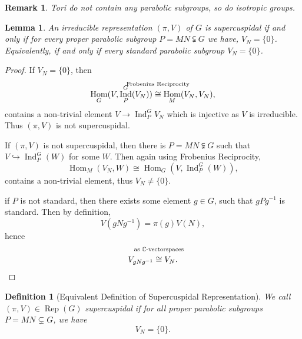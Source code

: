 \documentclass[8pt]{article}
\newtheorem{definition}{Definition}[section]
\newtheorem{lemma}{Lemma}[section]
\newtheorem{remark}{Remark}[section]
\DeclareMathOperator{\Ind}{Ind}
\DeclareMathOperator{\Rep}{Rep}
\DeclareMathOperator{\Hom}{Hom}
\newcommand{\C}[0]{\mathbb{C}}
\begin{document}
\begin{remark}
  Tori do not contain any parabolic subgroups, so do isotropic groups.
\end{remark}

\begin{lemma}
  \label{lemma_50}
  An irreducible representation $(\pi,V)$ of $G$ is supercuspidal if and only if for every proper parabolic subgroup $P=MN\subsetneqq G$ we have, $V_N=\{0\}$. Equivalently,
  if and only if every standard parabolic subgroup $V_N=\{0\}$.
\end{lemma}
\begin{proof}
  If $V_N=\{0\}$, then 
  \begin{equation*}
    \Hom_G(V,\Ind_P^G(V_N))\stackrel{\substack{\text{\makebox[0pt][c]{Frobenius Reciprocity}}\\\:}}{\cong} \Hom_M(V_N,V_N),
  \end{equation*}
  contains a non-trivial element $V\to\Ind_P^GV_N$ which is injective as $V$ is irreducible. Thus $(\pi,V)$ is not supercuspidal.
  \par If $(\pi,V)$ is not supercuspidal, then there is $P=MN\subsetneqq G$ such that $V\hookrightarrow \Ind_P^G(W)$ for some $W$. Then again using Frobenius Reciprocity,
  \begin{equation*}
    \Hom_M(V_N,W)\cong \Hom_G(V,\Ind_P^G(W)),
  \end{equation*}
  contains a non-trivial element, thus $V_N\not=\{0\}$.
  \par if $P$ is not standard, then there exists some element $g\in G$, such that $gPg^{-1}$ is standard. Then by definition, 
  \begin{equation*}
    V(gNg^{-1}) = \pi(g)V(N),
  \end{equation*}
  hence 
  \begin{equation*}
  V_{gNg^{-1}}\stackrel{\substack{\text{\makebox[2pt][c]{as $\C$-vectorspaces}}\\\:}}{\cong} V_N.
  \end{equation*}
\end{proof}
\begin{definition}[Equivalent Definition of Supercuspidal Representation]
  We call $(\pi,V)\in\Rep(G)$ supercuspidal if for all proper parabolic subgroups $P=MN\subsetneq G$, we have 
  \begin{equation*}
    V_N = \{0\}.
  \end{equation*}
\end{definition}
\end{document}
